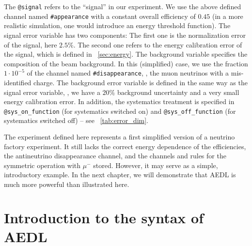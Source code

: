The {\tt @signal} refers to the ``signal'' in our experiment. We use the
above defined channel named {\tt \#appearance} with a constant overall
efficiency of $0.45$ (in a more realistic simulation, one would introduce an
energy threshold function). The signal error variable has two components: 
The first one is the normalization error of the signal, here $2.5\%$. The second 
one refers to the energy calibration error of the signal, which is defined 
in \Sec~\ref{sec:energy}. The background variable
specifies the composition of the beam background. In this (simplified) case, we
use the fraction $1\cdot 10^{-5}$ of the channel named {\tt \#disappearance}, \ie , the muon neutrinos with a mis-identified charge. 
The background error variable is defined in the same way as the signal error variable, \ie , we have a $20\%$ background uncertainty and a very small energy calibration error. In addition, the systematics treatment is specified
in {\tt @sys\_on\_function} (for systematics switched on) and {\tt @sys\_off\_function} (for systematics switched off) -- see \Tab~\ref{tab:error_dim}. 

The experiment defined here represents a first simplified version of a neutrino factory experiment. It still lacks the correct energy dependence of the efficiencies, the antineutrino disappearance channel, and the channels and rules for the symmetric operation with $\mu^-$ stored. However, it may serve as a simple, introductory example. In the next chapter, we will demonstrate that AEDL is much more powerful than illustrated here.


\section{Introduction to the syntax of AEDL}
\label{sec:syntax}

